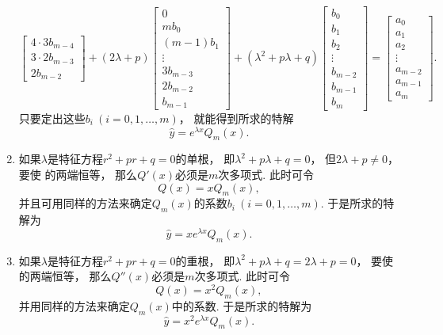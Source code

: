 \begin{enumerate}
\[\begin{bmatrix}
			4\cdot3 b_{m-4} \\ 3\cdot2 b_{m-3} \\ 2 b_{m-2}
		\end{bmatrix}
		+ (2\lambda+p)
		\begin{bmatrix}
			0 \\ m b_0 \\ (m-1) b_1 \\ \vdots \\
			3 b_{m-3} \\ 2 b_{m-2} \\ b_{m-1}
		\end{bmatrix}
		+ (\lambda^2+p\lambda+q)
		\begin{bmatrix}
			b_0 \\ b_1 \\ b_2 \\ \vdots \\
			b_{m-2} \\ b_{m-1} \\ b_m
		\end{bmatrix}
		= \begin{bmatrix}
			a_0 \\ a_1 \\ a_2 \\ \vdots \\
			a_{m-2} \\ a_{m-1} \\ a_m
		\end{bmatrix}.
	\]
	只要定出这些\(b_i\ (i=0,1,\dotsc,m)\)，
	就能得到所求的特解\begin{equation}
		\hat{y} = e^{\lambda x} Q_m(x).
	\end{equation}

	\item 如果\(\lambda\)是特征方程\(r^2+pr+q=0\)的单根，
	即\(\lambda^2+p\lambda+q=0\)，
	但\(2\lambda+p\neq0\)，
	要使  的两端恒等，
	那么\(Q'(x)\)必须是\(m\)次多项式.
	此时可令\[
		Q(x) = x Q_m(x),
	\]
	并且可用同样的方法来确定\(Q_m(x)\)的系数\(b_i\ (i=0,1,\dotsc,m)\).
	于是所求的特解为\begin{equation}
		\hat{y} = x e^{\lambda x} Q_m(x).
	\end{equation}

	\item 如果\(\lambda\)是特征方程\(r^2+pr+q=0\)的重根，
	即\(\lambda^2+p\lambda+q=2\lambda+p=0\)，
	要使  的两端恒等，
	那么\(Q''(x)\)必须是\(m\)次多项式.
	此时可令\[
		Q(x) = x^2 Q_m(x),
	\]
	并用同样的方法来确定\(Q_m(x)\)中的系数.
	于是所求的特解为\begin{equation}
		\hat{y} = x^2 e^{\lambda x} Q_m(x).
	\end{equation}
\end{enumerate}

